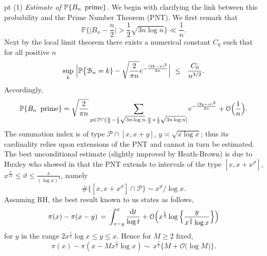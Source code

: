 \documentclass[11pt,draft,reqno]{amsart}
\theoremstyle{definition}
\theoremstyle{remarks}
\numberwithin{equation}{section}
\def \t{{\vartheta}}
\def \noi{{\noindent}}
\def \dd{{\rm d}}
\def\P{{\mathcal P}}
\def\P{{\mathbb P}}
\begin{document}
  pt  \noi (1) {\it Estimate of $\P\{ B_n\,\hbox{  prime} \}$.}
We begin  with clarifying   the link between this probability and the Prime Number Theorem (PNT).
We first remark that
$$\P\Big\{ \big|B_n-\frac{n}{2}\big|>\frac12 \sqrt{3n\log n}\Big\}\ll \frac{1}{n}.$$
 Next by the local limit theorem
 there exists a numerical constant $C_0$ such that for all positive $n$
 \begin{eqnarray*}  \sup_{k}\, \Big|  {\mathbb P}\big\{\mathcal B_n=k\}
 -\sqrt{\frac{2}{\pi n}} e^{-{ (2k-n)^2\over
2 n}}\Big|\ \le \
  \  \frac{C_0}{n^{3/2}}  .
  \end{eqnarray*}
 Accordingly, 
 $$\P\{ B_n\,\hbox{  prime} \}=\sqrt{\frac{2}{\pi n}} \sum_{p\in\mathcal P\cap [\frac{n}{2}-\frac12 \sqrt{3n\log n},\frac{n}{2}+\frac12 \sqrt{3n\log n}]}   e^{-{ (2p-n)^2\over
2 n}}+\mathcal O\Big(\frac{1}{n}\Big) .$$
  The summation index is of type $\mathcal P\cap [x, x+y]$, $y\asymp \sqrt{x\log x}$; thus its cardinality relies upon extensions of the PNT  and cannot in turn be estimated.
  The best   unconditional estimate (slightly improved by Heath-Brown) is due to Huxley who showed in \cite{Hu}    that the PNT extends to intervals of the type $[x,x+x^\t]$,   $x^{\frac{7}{12} }  \le \t\le \frac{x}{(\log x)^4}$, namely
\begin{equation*}
\#\{[x,x+x^\t]\cap \mathcal P\} \sim  {x^\t}/{ \log x }.
\end{equation*} 
  Assuming   RH, the best result known to us states as follows,
\begin{equation}\label{RH.pi}\pi(x)-\pi(x-y)\, =\, \int_{x-y}^x \frac{\dd t}{\log t}+ 
\mathcal O\Big( x^{\frac{1}{2}}\log \Big\{ \frac{y}{x^{\frac{1}{2}}\log x}\Big\}\Big)
\end{equation}
for $y$ in the range 
$ 2x^{\frac{1}{2}}\log x \le y\le x$. Hence for $M\ge 2$ fixed,
\begin{equation}\pi(x)-\pi(x-Mx^{\frac{1}{2}}\log x)
\sim\,  x^{\frac{1}{2}} \big\{M+ 
\mathcal O\big(  \log M\big)\big\}.\end{equation}
\end{document}
